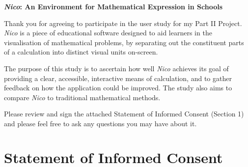 \documentclass[14pt]{article}
\begin{document}
\begin{center}

{\LARGE {\bf \emph{Nico}: An Environment for Mathematical Expression in Schools}}

\end{center}

Thank you for agreeing to participate in the user study for my Part II Project.
\emph{Nico} is a piece of educational software designed to aid learners in the
visualisation of mathematical problems, by separating out the constituent parts
of a calculation into distinct visual units on-screen.

The purpose of this study is to ascertain how well \emph{Nico} achieves its goal
of providing a clear, accessible, interactive means of calculation, and to gather
feedback on how the application could be improved.  The study also aims to compare
\emph{Nico} to traditional mathematical methods.

Please review and sign the attached Statement of Informed Consent (Section 1)
and please feel free to ask any questions you may have about it.

\section{Statement of Informed Consent}
\end{document}
